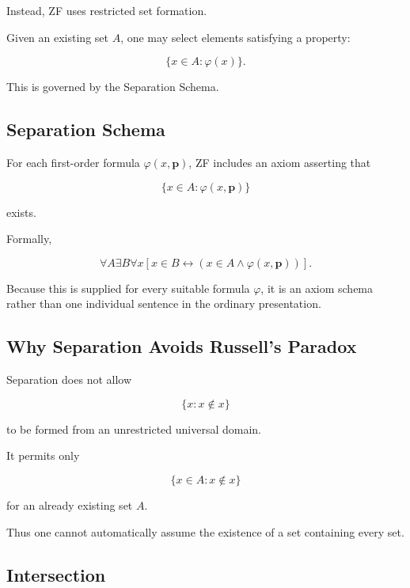 Instead, ZF uses restricted set formation.

Given an existing set \(A\), one may select elements satisfying a property:

\[
\boxed{
\{x\in A:\varphi(x)\}.
}
\]

This is governed by the Separation Schema.

\subsection{Separation Schema}
\label{subsec:separation-schema}

For each first-order formula \(\varphi(x,\mathbf{p})\), ZF includes an
axiom asserting that

\[
\boxed{
\{x\in A:\varphi(x,\mathbf{p})\}
}
\]

exists.

Formally,

\[
\boxed{
\forall A
\exists B
\forall x
\left[
x\in B
\leftrightarrow
(x\in A\land\varphi(x,\mathbf{p}))
\right].
}
\]

Because this is supplied for every suitable formula \(\varphi\), it is an
axiom schema rather than one individual sentence in the ordinary
presentation.

\subsection{Why Separation Avoids Russell's Paradox}
\label{subsec:separation-russell}

Separation does not allow

\[
\{x:x\notin x\}
\]

to be formed from an unrestricted universal domain.

It permits only

\[
\boxed{
\{x\in A:x\notin x\}
}
\]

for an already existing set \(A\).

Thus one cannot automatically assume the existence of a set containing
every set.

\subsection{Intersection}
\label{subsec:axiomatic-intersection}

